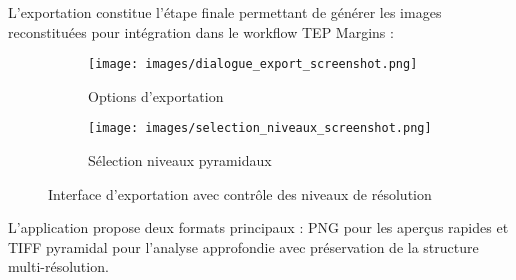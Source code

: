 L'exportation constitue l'étape finale permettant de générer les images reconstituées pour intégration dans le workflow TEP Margins :

\begin{figure}[H]
\centering
\begin{subfigure}{0.48\textwidth}
\texttt{[image: images/dialogue\_export\_screenshot.png]}
\caption{Options d'exportation}
\end{subfigure}
\hfill
\begin{subfigure}{0.48\textwidth}
\texttt{[image: images/selection\_niveaux\_screenshot.png]}
\caption{Sélection niveaux pyramidaux}
\end{subfigure}
\caption{Interface d'exportation avec contrôle des niveaux de résolution}
\end{figure}

L'application propose deux formats principaux : PNG pour les aperçus rapides et TIFF pyramidal pour l'analyse approfondie avec préservation de la structure multi-résolution.